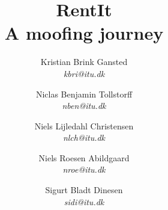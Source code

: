\title{RentIt\\A moofing journey}
\author{Kristian Brink Gansted\\ \emph{kbri@itu.dk}
    \and Niclas Benjamin Tollstorff\\ \emph{nben@itu.dk}
    \and Niels Lijledahl Christensen\\ \emph{nlch@itu.dk}
    \and Niels Roesen Abildgaard\\ \emph{nroe@itu.dk}
    \and Sigurt Bladt Dinesen\\ \emph{sidi@itu.dk}}

\maketitle
